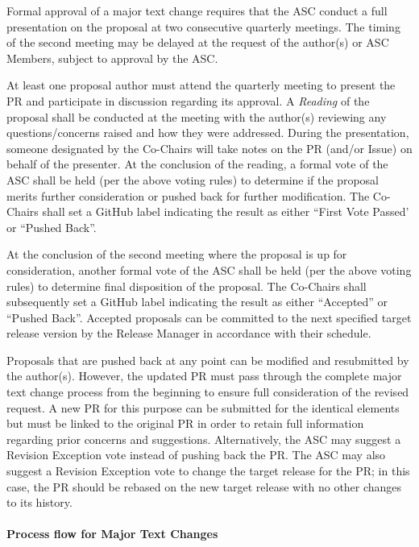 \documentclass{article}
\begin{document}
Formal approval of a major text change requires that the ASC conduct a full
presentation on the proposal at two consecutive quarterly meetings. The
timing of the second meeting may be delayed at the request of the
author(s) or ASC Members, subject to approval by the ASC.

At least one proposal author must attend the quarterly meeting to
present the PR and participate in discussion regarding its approval. A
\textit{Reading} of the proposal shall be conducted at the meeting with the
author(s) reviewing any questions/concerns raised and how they were
addressed. During the presentation, someone designated by the Co-Chairs
will take notes on the PR (and/or Issue) on behalf of the presenter.
At the conclusion of the reading, a formal vote of the ASC shall be held
(per the above voting rules) to determine if the proposal merits further
consideration or pushed back for further modification.
The Co-Chairs shall set a GitHub label indicating the
result as either ``First Vote Passed' or ``Pushed Back''.

At the conclusion of the second meeting where the proposal is up for
consideration, another formal vote of the ASC shall be held (per the
above voting rules) to determine final disposition of the proposal. The
Co-Chairs shall subsequently set a GitHub label indicating the result as
either ``Accepted'' or ``Pushed Back''. Accepted
proposals can be committed to the next specified target release version
by the Release Manager in accordance with their schedule.

Proposals that are pushed back at any point can be modified and
resubmitted by the author(s). However, the updated PR must pass through
the complete major text change process from the beginning to ensure full
consideration of the revised request. A new PR for this purpose can be
submitted for the identical elements but must be linked to the original
PR in order to retain full information regarding prior concerns and
suggestions. Alternatively, the ASC may suggest a Revision Exception vote
instead of pushing back the PR. The ASC may also suggest a Revision Exception
vote to change the target release for the PR; in this case, the PR should
be rebased on the new target release with no other changes to its history.

\hypertarget{process-flow-for-major-text-changes}{%
\paragraph{Process flow for Major Text Changes}%
\label{process-flow-for-major-text-changes}}
\end{document}

